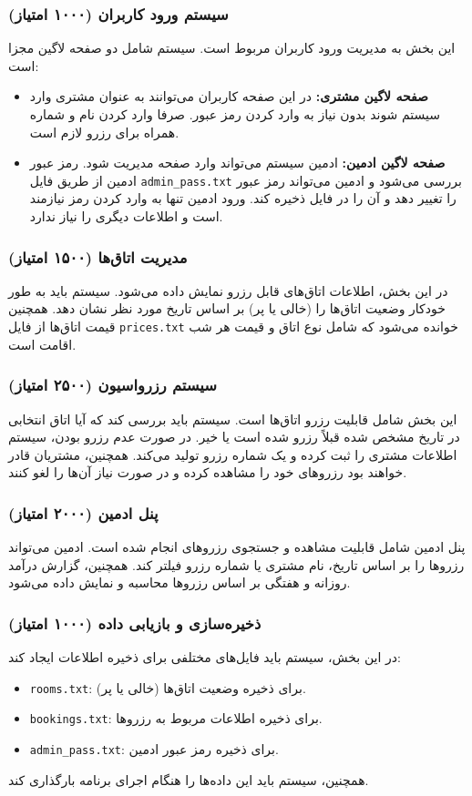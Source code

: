 \subsubsection*{سیستم ورود کاربران (۱۰۰۰ امتیاز)}
این بخش به مدیریت ورود کاربران مربوط است. سیستم شامل دو صفحه لاگین مجزا است:
\begin{itemize}
  \item \textbf{صفحه لاگین مشتری:} در این صفحه کاربران می‌توانند به عنوان مشتری وارد سیستم شوند بدون نیاز به وارد کردن رمز عبور. صرفا وارد کردن نام و شماره همراه برای رزرو لازم است.
  \item \textbf{صفحه لاگین ادمین:} ادمین سیستم می‌تواند وارد صفحه مدیریت شود. رمز عبور ادمین از طریق فایل \texttt{admin\_pass.txt} بررسی می‌شود و ادمین می‌تواند رمز عبور را تغییر دهد و آن را در فایل ذخیره کند. ورود ادمین تنها به وارد کردن رمز نیازمند است و اطلاعات دیگری را نیاز ندارد.
\end{itemize}

\subsubsection*{مدیریت اتاق‌ها (۱۵۰۰ امتیاز)}
در این بخش، اطلاعات اتاق‌های قابل رزرو نمایش داده می‌شود. سیستم باید به طور خودکار وضعیت اتاق‌ها را (خالی یا پر) بر اساس تاریخ مورد نظر نشان دهد. همچنین قیمت اتاق‌ها از فایل \texttt{prices.txt} خوانده می‌شود که شامل نوع اتاق و قیمت هر شب اقامت است.

\subsubsection*{سیستم رزرواسیون (۲۵۰۰ امتیاز)}
این بخش شامل قابلیت رزرو اتاق‌ها است. سیستم باید بررسی کند که آیا اتاق انتخابی در تاریخ مشخص شده قبلاً رزرو شده است یا خیر. در صورت عدم رزرو بودن، سیستم اطلاعات مشتری را ثبت کرده و یک شماره رزرو تولید می‌کند. همچنین، مشتریان قادر خواهند بود رزروهای خود را مشاهده کرده و در صورت نیاز آن‌ها را لغو کنند.

\subsubsection*{پنل ادمین (۲۰۰۰ امتیاز)}
پنل ادمین شامل قابلیت مشاهده و جستجوی رزروهای انجام شده است. ادمین می‌تواند رزروها را بر اساس تاریخ، نام مشتری یا شماره رزرو فیلتر کند. همچنین، گزارش درآمد روزانه و هفتگی بر اساس رزروها محاسبه و نمایش داده می‌شود.

\subsubsection*{ذخیره‌سازی و بازیابی داد‌ه (۱۰۰۰ امتیاز)}
در این بخش، سیستم باید فایل‌های مختلفی برای ذخیره اطلاعات ایجاد کند:
\begin{itemize}
  \item \texttt{rooms.txt}: برای ذخیره وضعیت اتاق‌ها (خالی یا پر).
  \item \texttt{bookings.txt}: برای ذخیره اطلاعات مربوط به رزروها.
  \item \texttt{admin\_pass.txt}: برای ذخیره رمز عبور ادمین.
\end{itemize}
همچنین، سیستم باید این داده‌ها را هنگام اجرای برنامه بارگذاری کند.

